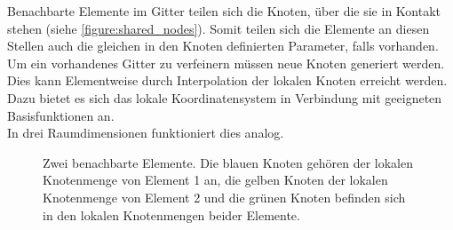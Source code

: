 \documentclass[
	a4paper,			%
	11pt,				%
	headsepline,		%
	bibtotoc,			%
	BCOR18mm,      		%
	DIV14,				%
	headings=normal,
	numbers=noenddot,
]{scrbook}
\theoremstyle{mythmstyle}
\theoremstyle{other}
\begin{document}
		Benachbarte Elemente im Gitter teilen sich die Knoten, über die sie in
	 	Kontakt stehen (siehe \autoref{figure:shared_nodes}). Somit teilen sich
	 	die Elemente an diesen Stellen auch die gleichen in den Knoten definierten
	 	Parameter, falls vorhanden.
	 	Um ein vorhandenes Gitter zu verfeinern müssen neue Knoten generiert
	 	werden. Dies kann Elementweise durch Interpolation der lokalen Knoten
	 	 erreicht werden. Dazu bietet es sich das lokale Koordinatensystem in 
	 	Verbindung mit geeigneten Basisfunktionen an. \\
	 	In drei Raumdimensionen funktioniert dies analog.
	 	\clearpage
		\begin{figure}[h]
		\begin{center}
		
		\end{center}
		\caption{Zwei benachbarte Elemente. Die blauen Knoten gehören der lokalen 
		Knotenmenge von Element 1 an, die gelben Knoten der lokalen
		Knotenmenge von Element 2  und die grünen Knoten befinden sich in
		den lokalen Knotenmengen beider Elemente. }
		 \label{figure:shared_nodes}
		\end{figure}
		
\end{document}
